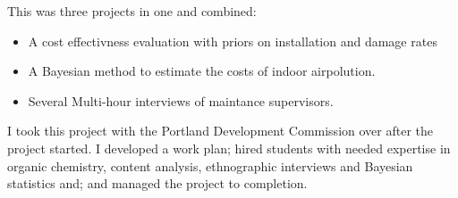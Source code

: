 \documentclass[margin]{res}
\begin{document}
\begin{resume}
This was three projects in one and combined:
\begin{itemize}
\item A cost effectivness evaluation with priors on installation and damage rates 
\item A Bayesian method to estimate the costs of indoor airpolution.
\item Several Multi-hour interviews of maintance supervisors.
\end{itemize}

I took this project with the Portland  Development Commission over after the project started. I developed a work plan; hired students with needed expertise in organic chemistry, content analysis, ethnographic interviews and Bayesian statistics and; and managed the project to completion.




\end{resume}
\end{document}
